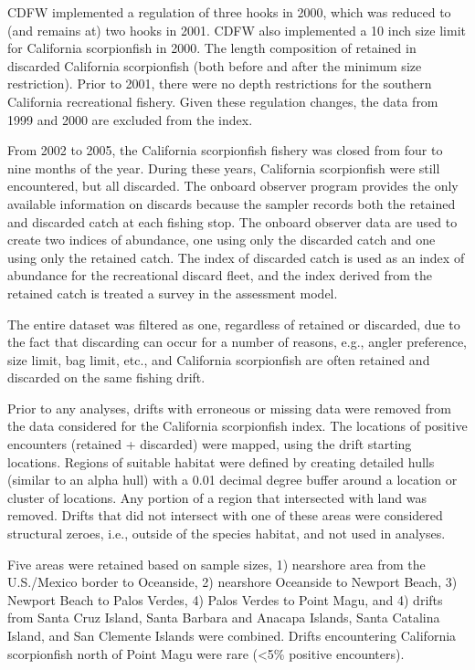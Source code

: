 \documentclass[12pt,]{article}
\begin{document}
CDFW implemented a regulation of three hooks in 2000, which was reduced
to (and remains at) two hooks in 2001. CDFW also implemented a 10 inch
size limit for California scorpionfish in 2000. The length composition
of retained in discarded California scorpionfish (both before and after
the minimum size restriction). Prior to 2001, there were no depth
restrictions for the southern California recreational fishery. Given
these regulation changes, the data from 1999 and 2000 are excluded from
the index.

From 2002 to 2005, the California scorpionfish fishery was closed from
four to nine months of the year. During these years, California
scorpionfish were still encountered, but all discarded. The onboard
observer program provides the only available information on discards
because the sampler records both the retained and discarded catch at
each fishing stop. The onboard observer data are used to create two
indices of abundance, one using only the discarded catch and one using
only the retained catch. The index of discarded catch is used as an
index of abundance for the recreational discard fleet, and the index
derived from the retained catch is treated a survey in the assessment
model.

The entire dataset was filtered as one, regardless of retained or
discarded, due to the fact that discarding can occur for a number of
reasons, e.g., angler preference, size limit, bag limit, etc., and
California scorpionfish are often retained and discarded on the same
fishing drift.

Prior to any analyses, drifts with erroneous or missing data were
removed from the data considered for the California scorpionfish index.
The locations of positive encounters (retained + discarded) were mapped,
using the drift starting locations. Regions of suitable habitat were
defined by creating detailed hulls (similar to an alpha hull) with a
0.01 decimal degree buffer around a location or cluster of locations.
Any portion of a region that intersected with land was removed. Drifts
that did not intersect with one of these areas were considered
structural zeroes, i.e., outside of the species habitat, and not used in
analyses.

Five areas were retained based on sample sizes, 1) nearshore area from
the U.S./Mexico border to Oceanside, 2) nearshore Oceanside to Newport
Beach, 3) Newport Beach to Palos Verdes, 4) Palos Verdes to Point Magu,
and 4) drifts from Santa Cruz Island, Santa Barbara and Anacapa Islands,
Santa Catalina Island, and San Clemente Islands were combined. Drifts
encountering California scorpionfish north of Point Magu were rare
(\textless{}5\% positive encounters).
\end{document}
